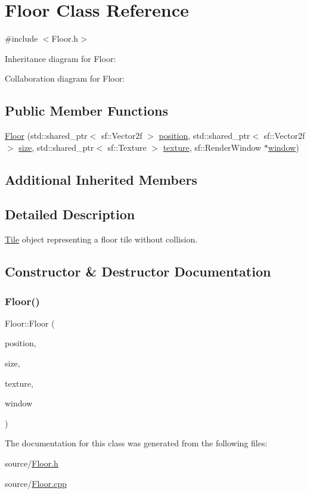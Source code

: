 \hypertarget{classFloor}{}\section{Floor Class Reference}
\label{classFloor}


{\ttfamily \#include $<$Floor.\+h$>$}



Inheritance diagram for Floor\+:


Collaboration diagram for Floor\+:
\subsection*{Public Member Functions}
\begin{DoxyCompactItemize}
\item 
\hyperlink{classFloor_a00b489dc1bd8c222b94a5dd8d37821ac}{Floor} (std\+::shared\+\_\+ptr$<$ sf\+::\+Vector2f $>$ \hyperlink{classObject_a8b1724482fb412feb64a638038161b7a}{position}, std\+::shared\+\_\+ptr$<$ sf\+::\+Vector2f $>$ \hyperlink{classObject_ac8bfde5d0428d9c091854fe1a09b7d9f}{size}, std\+::shared\+\_\+ptr$<$ sf\+::\+Texture $>$ \hyperlink{classObject_a8ff6491b841d0f48da3d98041fbca934}{texture}, sf\+::\+Render\+Window $\ast$\hyperlink{classObject_a5c6cfc086ea1e39e0b3cf8633a763bf8}{window})
\end{DoxyCompactItemize}
\subsection*{Additional Inherited Members}


\subsection{Detailed Description}
\hyperlink{classTile}{Tile} object representing a floor tile without collision. 

\subsection{Constructor \& Destructor Documentation}
\mbox{\label{classFloor_a00b489dc1bd8c222b94a5dd8d37821ac}} 
\subsubsection{\texorpdfstring{Floor()}{Floor()}}
{\footnotesize\ttfamily Floor\+::\+Floor (\begin{DoxyParamCaption}\item[{std\+::shared\+\_\+ptr$<$ sf\+::\+Vector2f $>$}]{position,  }\item[{std\+::shared\+\_\+ptr$<$ sf\+::\+Vector2f $>$}]{size,  }\item[{std\+::shared\+\_\+ptr$<$ sf\+::\+Texture $>$}]{texture,  }\item[{sf\+::\+Render\+Window $\ast$}]{window }\end{DoxyParamCaption})}



The documentation for this class was generated from the following files\+:\begin{DoxyCompactItemize}
\item 
source/\hyperlink{Floor_8h}{Floor.\+h}\item 
source/\hyperlink{Floor_8cpp}{Floor.\+cpp}\end{DoxyCompactItemize}
